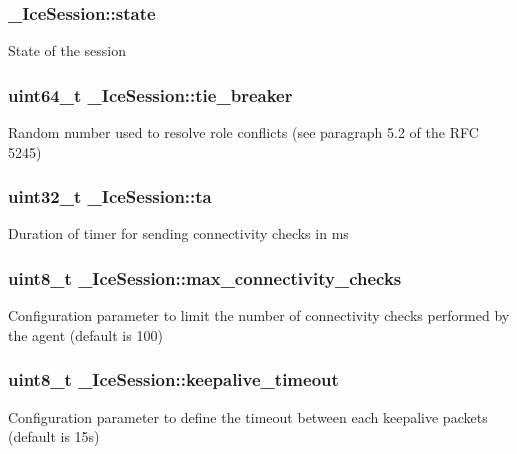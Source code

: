 \subsubsection[{state}]{ {\bf \_\-IceSession::state}}\label{struct__IceSession_a66281b0aa96c3914031a489499ecb5c2}
State of the session 
\subsubsection[{tie\_\-breaker}]{\setlength{\rightskip}{0pt plus 5cm}uint64\_\-t {\bf \_\-IceSession::tie\_\-breaker}}\label{struct__IceSession_a0a5465370a616123ab40bcb2783791ba}
Random number used to resolve role conflicts (see paragraph 5.2 of the RFC 5245) 
\subsubsection[{ta}]{\setlength{\rightskip}{0pt plus 5cm}uint32\_\-t {\bf \_\-IceSession::ta}}\label{struct__IceSession_ad7db59b18b696629923b4007dd7cb8ba}
Duration of timer for sending connectivity checks in ms 
\subsubsection[{max\_\-connectivity\_\-checks}]{\setlength{\rightskip}{0pt plus 5cm}uint8\_\-t {\bf \_\-IceSession::max\_\-connectivity\_\-checks}}\label{struct__IceSession_a154d6b0bd4834d047c37d44914b64330}
Configuration parameter to limit the number of connectivity checks performed by the agent (default is 100) 
\subsubsection[{keepalive\_\-timeout}]{\setlength{\rightskip}{0pt plus 5cm}uint8\_\-t {\bf \_\-IceSession::keepalive\_\-timeout}}\label{struct__IceSession_a1f9e3ba5eda2de70f14d53c2e5afa628}
Configuration parameter to define the timeout between each keepalive packets (default is 15s) 
